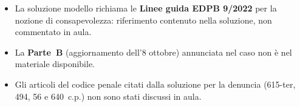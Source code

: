 \begin{verifica}
\begin{itemize}
  \item La soluzione modello richiama le \textbf{Linee guida EDPB 9/2022} per la nozione di
    consapevolezza: riferimento contenuto nella soluzione, non commentato in aula.
  \item La \textbf{Parte~B} (aggiornamento dell'8 ottobre) annunciata nel caso non è nel materiale
    disponibile.
  \item Gli articoli del codice penale citati dalla soluzione per la denuncia (615-ter, 494, 56 e
    640~c.p.) non sono stati discussi in aula.
\end{itemize}
\end{verifica}
